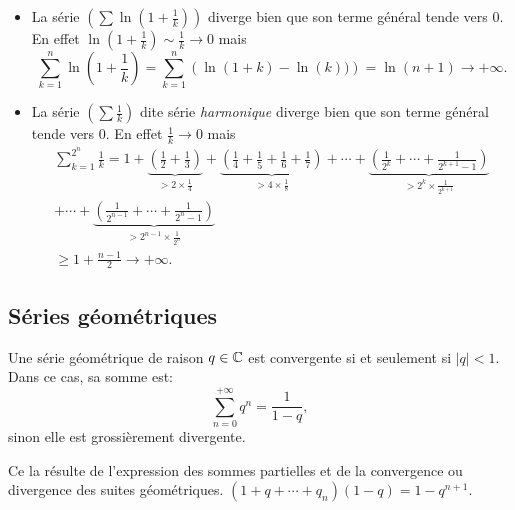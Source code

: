 \begin{itemize}
 \item La série $\left( \sum \ln(1+\frac{1}{k}) \right)$ diverge bien que son terme général tende vers $0$. En effet $\ln(1+\frac{1}{k}) \sim \frac{1}{k} \rightarrow 0$ mais 
 \[
  \sum_{k=1}^{n}\ln(1+\frac{1}{k}) = \sum_{k=1}^{n}\left( \ln(1+k) - \ln(k))\right) = \ln(n+1) \rightarrow +\infty. 
 \]
 
 \item La série $\left( \sum \frac{1}{k} \right)$ dite série \emph{harmonique}  diverge bien que son terme général tende vers $0$. En effet $\frac{1}{k} \rightarrow 0$ mais
 \begin{multline*}
  \sum_{k=1}^{2^n}\frac{1}{k} 
  = 1 
  + \underset{> 2\times \frac{1}{4}}{\underbrace{\left( \frac{1}{2} + \frac{1}{3}\right)}} 
  + \underset{> 4 \times\frac{1}{8}}{\underbrace{\left( \frac{1}{4} + \frac{1}{5} + \frac{1}{6} +\frac{1}{7}\right)}}
  + \cdots 
  + \underset{> 2^k \times \frac{1}{2^{k+1}}}{\underbrace{\left( \frac{1}{2^{k}} + \cdots + \frac{1}{2^{k+1}-1}\right)}} \\
  + \cdots 
  + \underset{> 2^{n-1} \times \frac{1}{2^{n}}}{\underbrace{\left( \frac{1}{2^{n-1}} + \cdots + \frac{1}{2^{n}-1}\right)}}\\
  \geq 1 + \frac{n-1}{2} \rightarrow + \infty.
 \end{multline*}
\end{itemize}

\clearpage
\subsection{Séries géométriques}
Une série géométrique de raison $q \in \mathbb{C}$ est convergente si et seulement si $|q|<1$. Dans ce cas, sa somme est:
\begin{displaymath}
  \sum_{n=0}^{+\infty} q^n = \frac{1}{1-q},
\end{displaymath}
sinon elle est grossièrement divergente.
\begin{demo}
Ce la résulte de l'expression des sommes partielles et de la convergence ou divergence des suites géométriques.  $(1+q+\cdots + q_n)(1-q) = 1- q^{n+1}$.
\end{demo}
\newpage


